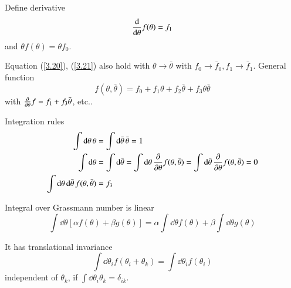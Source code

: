 Define derivative
\begin{equation}
   \dv{\theta} f(\theta) = f_1 \label{3.21}
\end{equation}
and $\theta f(\theta) = \theta f_0$. 

Equation (\ref{3.20}), (\ref{3.21}) also hold with $\theta \rightarrow \bar \theta$ with $f_0 \rightarrow \bar{f}_0, f_1 \rightarrow \bar{f}_1$. General function
\begin{equation}
   f(\theta, \bar\theta) = f_0 + f_1 \theta + f_2 \bar\theta + f_3 \theta \bar\theta \label{3.22}
\end{equation}
with $\pdv{\theta} f = f_1 + f_3 \bar\theta$, etc..

Integration rules
\begin{subequations}
   \label{3.23}   
\begin{align}
   \int \dd{\theta} \theta &= \int \dd{\bar\theta} \bar{\theta} = 1 \label{3.23a} \\
   \int \dd{\theta} &= \int \dd{\bar\theta} = \int \dd{\theta} \pdv{\theta} f(\theta,\bar\theta) = \int \dd{\bar\theta} \pdv{\theta} f(\theta,\bar\theta) = 0 \label{3.23c} \\
   \int \dd{\theta} \dd{\bar\theta} f(\theta, \bar\theta) &= f_3 \label{3.23b}
\end{align}
\end{subequations}

Integral over Grassmann number is linear
\begin{equation}
   \int \dd{\theta} \left[ \alpha f(\theta) + \beta g(\theta) \right] = \alpha \int \dd{\theta} f(\theta) + \beta \int \dd{\theta} g(\theta) \label{3.24}
\end{equation}

It has translational invariance
\begin{equation*}
   \int \dd{\theta_i} f(\theta_i + \theta_k) = \int \dd{\theta_i} f(\theta_i)
\end{equation*}
independent of $\theta_k$, if $\int \dd{\theta_i} \theta_k = \delta_{ik}$.

